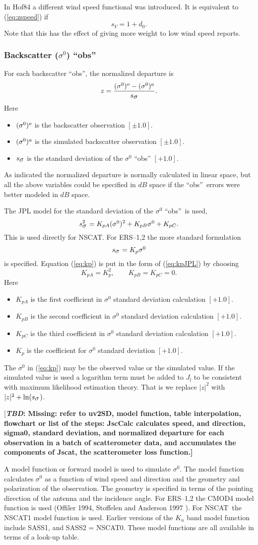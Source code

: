 \documentclass[11pt]{article}
\newcommand{\ers}[1]{ERS--{#1}}
\newcommand{\J}[1]{\mbox{$ J_{#1} $}}
\newcommand{\nscat}{NSCAT}
\newcommand{\obs}{``obs''}
\newcommand{\s}[1]{\mbox{$ \sigma^{#1} $}}
\newcommand{\xxxx}[1]{\subsubsection {#1}}
\newcommand{\TBD}[1]{{[\bfseries{\itshape{TBD: }{{#1}}}]}}
\newcommand{\reference}[2]{(#1 \cite{#2})}
\newcommand{\eql}[2]{\begin{equation} \label{eq:#1} #2 \end{equation}}
\newcommand{\eqr}[1]{(\ref{eq:#1})}
\newcommand{\COMMENT}[2]{{[\bfseries {\itshape #1}: {#2}]}}
\renewcommand{\TBD}[1]{\COMMENT{TBD}{{#1}}}
\newcommand{\vardef}[3]{\item $ {#1} $ is the {#2} $ [{#3}] $. }
\begin{document}
In Hof84 a different wind speed functional was introduced.  It is
equivalent to \eqr{zspeed} if
 \eql{snV}{ s_V = 1 + d_0 . }
 Note that this has the effect of giving more weight to low wind speed
reports. 

\xxxx {Backscatter (\s0) \obs}

For each backscatter \obs, the normalized departure is
 \eql{zs0}{ z = \frac{(\s0)^o - (\s0)^a}{s_{\s{}}} . }
 Here \begin{itemize}
  \vardef{(\s0)^o}{backscatter observation}{\pm 1.0}
  \vardef{(\s0)^a}{simulated backscatter observation}{\pm 1.0}
  \vardef{s_{\s{}}}{standard deviation of the \s0 \obs}{+1.0}
 \end{itemize} 

As indicated the normalized departure is normally calculated in linear
space, but all the above variables could be specified in $dB$ space if
the \obs\ errors were better modeled in $dB$ space.

The JPL model for the standard deviation of the \s0 \obs\ is used,
 \eql{kpJPL}{ s_{\s{}}^2 = K_{pA} (\s0)^2 + K_{pB} \s0 + K_{pC} . }
 This is used directly for \nscat.  For \ers1,2 the more standard
formulation
 \eql{kp}{  s_{\s{}} = K_p \s0 }
 is specified.  Equation \eqr{kp} is put in the form of \eqr{kpJPL} by
choosing
 \eql{kpABC}{ K_{pA} = K_{p}^2, \qquad K_{pB} = K_{pC} = 0. }
 Here \begin{itemize}
  \vardef{K_{pA}}{first coefficient in \s0 standard deviation calculation}{+ 1.0}
  \vardef{K_{pB}}{second coefficient in \s0 standard deviation calculation}{+ 1.0}
  \vardef{K_{pC}}{third coefficient in \s0 standard deviation calculation}{+ 1.0}
  \vardef{K_p}{coefficient for \s0 standard deviation}{+ 1.0}
 \end{itemize} 
 The \s0 in \eqr{kp} may be the observed value or the simulated
value.  If the simulated value is used a logarithm term must be added to
\J{l} to be consistent with maximum likelihood estimation theory.  That
is we replace $ |z|^2 $ with $ |z|^2 + \ln(s_{\s{}}) $.

\TBD{Missing: refer to uv2SD, model function, table interpolation,
flowchart or list of the steps: JscCalc calculates speed, and
direction, sigma0, standard deviation, and normalized departure for
each observation in a batch of scatterometer data, and accumulates the
components of Jscat, the scatterometer loss function.}

A model function or forward model is used to simulate \s0.  The model
function calculates \s0 as a function of wind speed and direction and
the geometry and polarization of the observation.  The geometry is
specified in terms of the pointing direction of the antenna and the
incidence angle.  For \ers1,2 the CMOD4 model function is used
\reference{Offiler 1994, Stoffelen and Anderson 1997}{Off94,StoA97a}.
For \nscat\ the NSCAT1 model function is used.  Earlier versions of
the $K_u$ band model function include SASS1, and SASS2 = NSCAT0.
These model functions are all available in terms of a look-up table.
\end{document}
